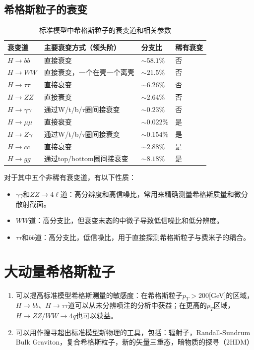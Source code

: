 \subsection{希格斯粒子的衰变}
\begin{table}[htbp]
    \caption{标准模型中希格斯粒子的衰变道和相关参数}\label{table:2.1}
    \centering
    \begin{tabular}{>{\centering\arraybackslash}p{2cm}%
    >{\centering\arraybackslash}p{7cm}%
    >{\centering\arraybackslash}p{2cm}%
    >{\centering\arraybackslash}p{2cm}}
    \toprule\toprule
    \textbf{衰变道} & \textbf{主要衰变方式（领头阶）} & \textbf{分支比} & \textbf{稀有衰变}\\
    \midrule
    $H\to bb$ & 直接衰变 & $\sim 58.1\%$ & 否\\
    $H\to WW$ & 直接衰变，一个在壳一个离壳 & $\sim 21.5\%$ & 否\\
    $H\to\tau\tau$ & 直接衰变 & $\sim 6.26\%$ & 否\\
    $H\to ZZ$ & 直接衰变 & $\sim2.64\%$ & 否\\
    $H\to \gamma\gamma$ & 通过W/t/b/$\tau$圈间接衰变 &  $\sim0.23\%$ & 否\\
    $H\to\mu\mu$ & 直接衰变 & $\sim 0.022\%$ & 是\\
    $H\to Z\gamma$ & 通过W/t/b/$\tau$圈间接衰变 & $\sim 0.154\%$ & 是\\
    $H\to cc$ & 直接衰变 & $\sim2.88\%$ & 是\\
    $H\to gg$ & 通过top/bottom圈间接衰变 & $\sim 8.18\%$ & 是\\
    \bottomrule\bottomrule
\end{tabular}
\end{table}
对于其中五个非稀有衰变道，有以下性质：
\begin{itemize}
    \item $\gamma\gamma$和$ZZ\to4\ell$道：高分辨度和高信噪比，常用来精确测量希格斯质量和微分散射截面。
    \item $WW$道：高分支比，但衰变末态的中微子导致低信噪比和低分辨度。
    \item $\tau\tau$和$bb$道：高分支比，低信噪比，用于直接探测希格斯粒子与费米子的耦合。
\end{itemize}

\section{大动量希格斯粒子}
\begin{enumerate}
    \item 可以提高标准模型希格斯测量的敏感度：在希格斯粒子$p_T>200$[GeV]的区域，$H\to bb$、$H\to\tau\tau$道可以从未分辨喷注的分析中获益；在更高的$p_T$区域，$H\to ZZ/WW\to 4q$也可以获益。
    \item 可以用作搜寻超出标准模型新物理的工具，包括：辐射子，Randall-Sundrum Bulk Graviton，复合希格斯粒子，新的矢量三重态，暗物质的探寻（2HDM）
\end{enumerate}


